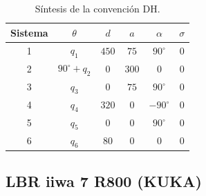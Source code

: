 \documentclass[a4paper,12pt]{article}
\begin{document}
\begin{table}[H]
    \centering
    \begin{tabular}{|c|c|c|c|c|c|}
    \hline
    Sistema & $\theta$          & $d$    & $a$   & $\alpha$    & $\sigma$ \\ \hline
    1       & $q_1$             & $450$  & $75$  & $90^\circ$  & 0        \\ \hline
    2       & $90^\circ + q_2$  & $0$    & $300$ & $0$         & 0        \\ \hline
    3       & $q_3$             & $0$    & $75$  & $90^\circ$  & 0        \\ \hline
    4       & $q_4$             & $320$  & $0$   & $-90^\circ$ & 0        \\ \hline
    5       & $q_5$             & $0$    & $0$   & $90^\circ$  & 0        \\ \hline
    6       & $q_6$             & $80$   & $0$   & $0$         & 0        \\ \hline
    \end{tabular}
    \caption{Síntesis de la convención DH.}
    \label{sintesis DH FANUC}
\end{table}

\subsection{LBR iiwa 7 R800 (KUKA)}
\label{subsec: robot 6}
\end{document}
